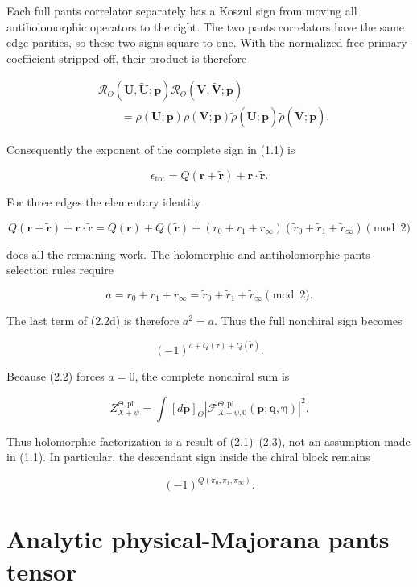 \documentclass[11pt]{article}
\begin{document}
Each full pants correlator separately has a Koszul sign from moving all
antiholomorphic operators to the right.  The two pants correlators have the
same edge parities, so these two signs square to one.  With the normalized
free primary coefficient stripped off, their product is therefore

\[
\begin{aligned}
&\mathcal R_\Theta(\mathbf U,\widetilde{\mathbf U};\mathbf p)
 \mathcal R_\Theta(\mathbf V,\widetilde{\mathbf V};\mathbf p)
\\
&\qquad=
 \rho(\mathbf U;\mathbf p)\rho(\mathbf V;\mathbf p)
 \widetilde\rho(\widetilde{\mathbf U};\mathbf p)
 \widetilde\rho(\widetilde{\mathbf V};\mathbf p).
\end{aligned}
\tag{2.2b}
\]

Consequently the exponent of the complete sign in (1.1) is

\[
 \epsilon_{\mathrm{tot}}
 =Q(\mathbf r+\widetilde{\mathbf r})
  +\mathbf r\mathbin{\cdot}\widetilde{\mathbf r}.
\tag{2.2c}
\]

For three edges the elementary identity

\[
 Q(\mathbf r+\widetilde{\mathbf r})
 +\mathbf r\mathbin{\cdot}\widetilde{\mathbf r}
 =Q(\mathbf r)+Q(\widetilde{\mathbf r})
  +(r_0+r_1+r_\infty)
   (\widetilde r_0+\widetilde r_1+\widetilde r_\infty)
 \pmod2
\tag{2.2d}
\]

does all the remaining work.  The holomorphic and antiholomorphic pants
selection rules require

\[
 a=r_0+r_1+r_\infty
  =\widetilde r_0+\widetilde r_1+\widetilde r_\infty
 \pmod2.
\tag{2.2e}
\]

The last term of (2.2d) is therefore \(a^2=a\).  Thus the full nonchiral
sign becomes

\[
 (-1)^{a+Q(\mathbf r)+Q(\widetilde{\mathbf r})}.
\tag{2.3}
\]

Because (2.2) forces \(a=0\), the complete nonchiral sum is

\[
 Z_{X+\psi}^{\Theta,\mathrm{pl}}
 =\int[d\mathbf p]_{\Theta}
  \left|
  \mathcal F_{X+\psi,0}^{\Theta,\mathrm{pl}}
       (\mathbf p;\mathbf q,\boldsymbol\eta)
  \right|^2.
\tag{2.4}
\]

Thus holomorphic factorization is a result of (2.1)--(2.3), not an
assumption made in (1.1).  In particular, the descendant sign inside the
chiral block remains

\[
 (-1)^{Q(\pi_0,\pi_1,\pi_\infty)}.
\tag{2.5}
\]

\section{Analytic physical-Majorana pants tensor}
\end{document}
